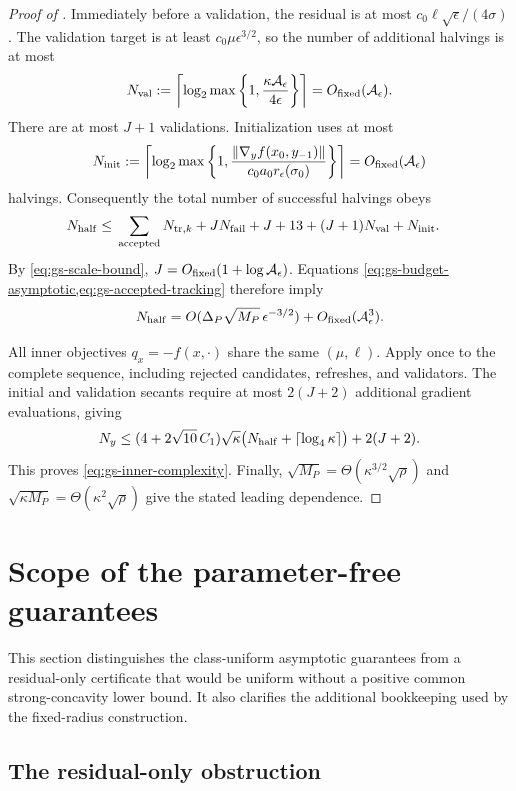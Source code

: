 \documentclass{article}
\begin{document}
\begin{proof}[Proof of ]
Immediately before a validation, the residual is at most
$c_0\ell\sqrt\epsilon/(4\sigma)$.  The validation target is at least
$c_0\mu\epsilon^{3/2}$, so the number of additional halvings is at
most
\[
 N_{\rm val}:=
 \left\lceil\log_2\max\left\{1,
  \frac{\kappa\mathcal A_\epsilon}{4\epsilon}\right\}\right\rceil
 =O_{\rm fixed}(\mathcal A_\epsilon).
\]
There are at most $J+1$ validations.  Initialization uses at most
\[
 N_{\rm init}:=
 \left\lceil\log_2\max\left\{1,
  \frac{\|\nabla_yf(x_0,y_{-1})\|}
       {c_0a_0r_\epsilon(\sigma_0)}\right\}\right\rceil
 =O_{\rm fixed}(\mathcal A_\epsilon)
\]
halvings.  Consequently the total number of successful halvings obeys
\begin{align}
 N_{\rm half}\le{}&
 \sum_{\rm accepted}N_{{\rm tr},k}
 +J N_{\rm fail}+J+13
 +(J+1)N_{\rm val}+N_{\rm init}.
 \label{eq:gs-total-halvings}
\end{align}
By \eqref{eq:gs-scale-bound},
$J=O_{\rm fixed}(1+\log\mathcal A_\epsilon)$.
Equations \eqref{eq:gs-budget-asymptotic,eq:gs-accepted-tracking}
therefore imply
\[
 N_{\rm half}
 =O(\Delta_P\sqrt{M_P}\,\epsilon^{-3/2})
  +O_{\rm fixed}(\mathcal A_\epsilon^3).
\]

All inner objectives $q_x=-f(x,\cdot)$ share the same $(\mu,\ell)$.
Apply  once to the complete sequence,
including rejected candidates, refreshes, and validators.
The initial and validation secants require at most $2(J+2)$
additional gradient evaluations, giving
\begin{equation}\label{eq:gs-inner-explicit}
 N_y\le(4+2\sqrt{10}\,C_1)\sqrt\kappa
       \bigl(N_{\rm half}+\lceil\log_4\kappa\rceil\bigr)
       +2(J+2).
\end{equation}
This proves \eqref{eq:gs-inner-complexity}.
Finally, $\sqrt{M_P}=\Theta(\kappa^{3/2}\sqrt\rho)$ and
$\sqrt{\kappa M_P}=\Theta(\kappa^2\sqrt\rho)$ give the stated leading
dependence.
\end{proof}

\section{Scope of the parameter-free guarantees}
\label{app:parameter-free-scope}
This section distinguishes the class-uniform asymptotic guarantees
from a residual-only certificate that would be uniform without a
positive common strong-concavity lower bound.  It also clarifies the
additional bookkeeping used by the fixed-radius construction.

\subsection{The residual-only obstruction}
\label{app:scar-limitation}
\end{document}
